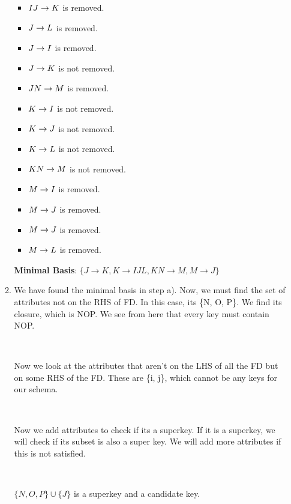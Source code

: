 \documentclass[boldsans]{article}
\begin{document}
\begin{enumerate}
\begin{enumerate}
        \begin{itemize}
            \item $IJ\rightarrow K$ is removed.
            \item $J\rightarrow L$ is removed.
            \item $J\rightarrow I$ is removed.
            \item $J\rightarrow K$ is not removed.
            \item $JN\rightarrow M$ is removed.
            \item $K\rightarrow I$ is not removed.
            \item $K\rightarrow J$ is not removed.
            \item $K\rightarrow L$ is not removed.
            \item $KN\rightarrow M$ is not removed.
            \item $M\rightarrow I$ is removed.
            \item $M\rightarrow J$ is removed.
            \item $M\rightarrow J$ is removed.
            \item $M\rightarrow L$ is removed.
            
        \end{itemize}
        
        \textbf{Minimal Basis}: 
        $\{ J\rightarrow K, K\rightarrow IJL, KN\rightarrow M, M\rightarrow J\}$
        
        
        
        \item 
        
        We have found the minimal basis in step a). Now, we must find the set of attributes not on the RHS of FD. In this case, its \{N, O, P\}. We find its closure, which is NOP. We see from here that every key must contain NOP.
        
        \
        
        Now we look at the attributes that aren't on the LHS of all the FD but on some RHS of the FD. These are \{i, j\}, which cannot be any keys for our schema.
        
        \ 
        
        Now we add attributes to check if its a superkey. If it is a superkey, we will check if its subset is also a super key. We will add more attributes if this is not satisfied.
        
        \
        
        $\{N, O, P\} \cup  \{J\}$ is a superkey and a candidate key.
        

\end{enumerate}
\end{enumerate}
\end{document}
